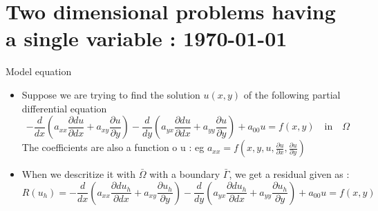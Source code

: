 




	\tableofcontents
	
	\section{Two dimensional problems having a single variable : \today}
	\begin{frame}{Model equation}
		\begin{itemize}
			\item Suppose we are trying to find the solution $u(x,y)$ of the following partial differential equation
			\begin{equation}
			 -\frac{d}{dx}\left(a_{xx} \frac{\partial du}{\partial dx} + a_{xy} \frac{\partial u}{\partial y} \right)
			 -\frac{d}{dy}\left(a_{yx} \frac{\partial du}{\partial dx} + a_{yy} \frac{\partial u}{\partial y} \right) + a_{00} u = f(x,y) \quad \text{in} \quad \Omega
			\end{equation}	
			The coefficients are also a function o u : eg $a_{xx} = f(x,y,u,\frac{\partial u}{\partial x }, \frac{\partial u}{\partial y})$
			\item When we descritize it with $\bar{\Omega}$ with a boundary $\bar{\Gamma}$, we get a residual given as :
			\begin{equation}
				R(u_h) = 
				-\frac{d}{dx}\left(a_{xx} \frac{\partial du_h}{\partial dx} + a_{xy} \frac{\partial u_h}{\partial y} \right)
				-\frac{d}{dy}\left(a_{yx} \frac{\partial du_h}{\partial dx} + a_{yy} \frac{\partial u_h}{\partial y} \right) + a_{00} u = f(x,y)
			\end{equation}
		\end{itemize}
	\end{frame}


